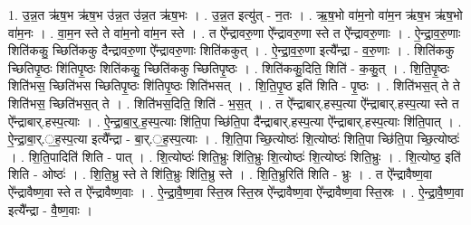 \documentclass[17pt]{extarticle}
\begin{document}
1. उ॒न्न॒त ऋ॑ष॒भ ऋ॑ष॒भ उ॑न्न॒त उ॑न्न॒त ऋ॑ष॒भः । . उ॒न्न॒त इत्यु॑त् - न॒तः । . ऋ॒ष॒भो वा॑म॒नो वा॑म॒न ऋ॑ष॒भ ऋ॑ष॒भो वा॑म॒नः । . वा॒म॒न स्ते ते वा॑म॒नो वा॑म॒न स्ते । . त ऐ᳚न्द्रावरु॒णा ऐ᳚न्द्रावरु॒णा स्ते त ऐ᳚न्द्रावरु॒णाः । . ऐ॒न्द्रा॒व॒रु॒णाः शिति॑ककु॒ च्छिति॑ककु दैन्द्रावरु॒णा ऐ᳚न्द्रावरु॒णाः शिति॑ककुत् । . ऐ॒न्द्रा॒व॒रु॒णा इत्यै᳚न्द्रा - व॒रु॒णाः । . शिति॑ककु च्छितिपृ॒ष्ठः शि॑तिपृ॒ष्ठः शिति॑ककु॒ च्छिति॑ककु च्छितिपृ॒ष्ठः । . शिति॑ककु॒दिति॒ शिति॑ - क॒कु॒त् । . शि॒ति॒पृ॒ष्ठः शिति॑भस॒ च्छिति॑भस च्छितिपृ॒ष्ठः शि॑तिपृ॒ष्ठः शिति॑भसत् । . शि॒ति॒पृ॒ष्ठ इति॑ शिति - पृ॒ष्ठः । . शिति॑भस॒त् ते ते शिति॑भस॒ च्छिति॑भस॒त् ते । . शिति॑भस॒दिति॒ शिति॑ - भ॒स॒त् । . त ऐ᳚न्द्राबार्.हस्प॒त्या ऐ᳚न्द्राबार्.हस्प॒त्या स्ते त ऐ᳚न्द्राबार्.हस्प॒त्याः । . ऐ॒न्द्रा॒बा॒र्॒.ह॒स्प॒त्याः शि॑ति॒पा च्छि॑ति॒पा दै᳚न्द्राबार्.हस्प॒त्या ऐ᳚न्द्राबार्.हस्प॒त्याः शि॑ति॒पात् । . ऐ॒न्द्रा॒बा॒र्.॒ह॒स्प॒त्या इत्यै᳚न्द्रा - बा॒र्.॒ह॒स्प॒त्याः । . शि॒ति॒पा च्छि॒त्योष्ठः॑ शि॒त्योष्ठः॑ शिति॒पा च्छि॑ति॒पा च्छि॒त्योष्ठः॑ । . शि॒ति॒पादिति॑ शिति - पात् । . शि॒त्योष्ठः॑ शिति॒भ्रुः शि॑ति॒भ्रुः शि॒त्योष्ठः॑ शि॒त्योष्ठः॑ शिति॒भ्रुः । . शि॒त्योष्ठ॒ इति॑ शिति - ओष्ठः॑ । . शि॒ति॒भ्रु स्ते ते शि॑ति॒भ्रुः शि॑ति॒भ्रु स्ते । . शि॒ति॒भ्रुरिति॑ शिति - भ्रुः । . त ऐ᳚न्द्रावैष्ण॒वा ऐ᳚न्द्रावैष्ण॒वा स्ते त ऐ᳚न्द्रावैष्ण॒वाः । . ऐ॒न्द्रा॒वै॒ष्ण॒वा स्ति॒स्र स्ति॒स्र ऐ᳚न्द्रावैष्ण॒वा ऐ᳚न्द्रावैष्ण॒वा स्ति॒स्रः । . ऐ॒न्द्रा॒वै॒ष्ण॒वा इत्यै᳚न्द्रा - वै॒ष्ण॒वाः । \newline
\end{document}
